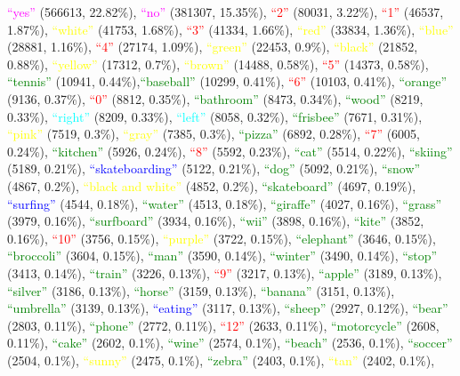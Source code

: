{\textcolor{magenta}{``yes''}} (566613, 22.82\%), {\textcolor{magenta}{``no''}} (381307, 15.35\%), {\textcolor{red}{``2''}} (80031, 3.22\%), {\textcolor{red}{``1''}} (46537, 1.87\%), {\textcolor{yellow}{``white''}} (41753, 1.68\%), {\textcolor{red}{``3''}} (41334, 1.66\%), {\textcolor{yellow}{``red''}} (33834, 1.36\%), {\textcolor{yellow}{``blue''}} (28881, 1.16\%), {\textcolor{red}{``4''}} (27174, 1.09\%), {\textcolor{yellow}{``green''}} (22453, 0.9\%), {\textcolor{yellow}{``black''}} (21852, 0.88\%), {\textcolor{yellow}{``yellow''}} (17312, 0.7\%), {\textcolor{yellow}{``brown''}} (14488, 0.58\%), {\textcolor{red}{``5''}} (14373, 0.58\%), {\textcolor{green}{``tennis''}} (10941, 0.44\%),{\textcolor{green}{``baseball''}} (10299, 0.41\%), {\textcolor{red}{``6''}} (10103, 0.41\%), {\textcolor{green}{``orange''}} (9136, 0.37\%), {\textcolor{red}{``0''}} (8812, 0.35\%), {\textcolor{green}{``bathroom''}} (8473, 0.34\%), {\textcolor{green}{``wood''}} (8219, 0.33\%), {\textcolor{cyan}{``right''}} (8209, 0.33\%), {\textcolor{cyan}{``left''}} (8058, 0.32\%), {\textcolor{green}{``frisbee''}} (7671, 0.31\%), {\textcolor{yellow}{``pink''}} (7519, 0.3\%), {\textcolor{yellow}{``gray''}} (7385, 0.3\%), {\textcolor{green}{``pizza''}} (6892, 0.28\%), {\textcolor{red}{``7''}} (6005, 0.24\%), {\textcolor{green}{``kitchen''}} (5926, 0.24\%), {\textcolor{red}{``8''}} (5592, 0.23\%), {\textcolor{green}{``cat''}} (5514, 0.22\%), {\textcolor{green}{``skiing''}} (5189, 0.21\%), {\textcolor{blue}{``skateboarding''}} (5122, 0.21\%), {\textcolor{green}{``dog''}} (5092, 0.21\%), {\textcolor{green}{``snow''}} (4867, 0.2\%), {\textcolor{yellow}{``black and white''}} (4852, 0.2\%), {\textcolor{green}{``skateboard''}} (4697, 0.19\%), {\textcolor{blue}{``surfing''}} (4544, 0.18\%), {\textcolor{green}{``water''}} (4513, 0.18\%), {\textcolor{green}{``giraffe''}} (4027, 0.16\%), {\textcolor{green}{``grass''}} (3979, 0.16\%), {\textcolor{green}{``surfboard''}} (3934, 0.16\%), {\textcolor{green}{``wii''}} (3898, 0.16\%), {\textcolor{green}{``kite''}} (3852, 0.16\%), {\textcolor{red}{``10''}} (3756, 0.15\%), {\textcolor{yellow}{``purple''}} (3722, 0.15\%), {\textcolor{green}{``elephant''}} (3646, 0.15\%), {\textcolor{green}{``broccoli''}} (3604, 0.15\%), {\textcolor{green}{``man''}} (3590, 0.14\%), {\textcolor{green}{``winter''}} (3490, 0.14\%), {\textcolor{green}{``stop''}} (3413, 0.14\%), {\textcolor{green}{``train''}} (3226, 0.13\%), {\textcolor{red}{``9''}} (3217, 0.13\%), {\textcolor{green}{``apple''}} (3189, 0.13\%), {\textcolor{green}{``silver''}} (3186, 0.13\%), {\textcolor{green}{``horse''}} (3159, 0.13\%), {\textcolor{green}{``banana''}} (3151, 0.13\%), {\textcolor{green}{``umbrella''}} (3139, 0.13\%), {\textcolor{blue}{``eating''}} (3117, 0.13\%), {\textcolor{green}{``sheep''}} (2927, 0.12\%), {\textcolor{green}{``bear''}} (2803, 0.11\%), {\textcolor{green}{``phone''}} (2772, 0.11\%), {\textcolor{red}{``12''}} (2633, 0.11\%), {\textcolor{green}{``motorcycle''}} (2608, 0.11\%), {\textcolor{green}{``cake''}} (2602, 0.1\%), {\textcolor{green}{``wine''}} (2574, 0.1\%), {\textcolor{green}{``beach''}} (2536, 0.1\%), {\textcolor{green}{``soccer''}} (2504, 0.1\%), {\textcolor{yellow}{``sunny''}} (2475, 0.1\%), {\textcolor{green}{``zebra''}} (2403, 0.1\%), {\textcolor{yellow}{``tan''}} (2402, 0.1\%), 